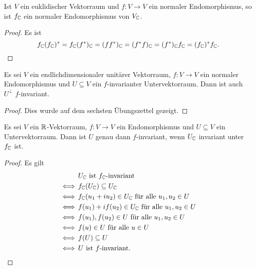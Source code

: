 \documentclass[a4paper,10pt]{article}
\begin{document}
\begin{corollary}\label{cor: complexification preserves normal}
  Ist $V$ ein euklidischer Vektorraum und $f \colon V \to V$ ein normaler Endomorphismus, so ist $f_{\mathbb{C}}$ ein normaler Endomorphismus von $V_{\mathbb{C}}$.
\end{corollary}


\begin{proof}
  Es ist
  \[
      f_{\mathbb{C}} (f_{\mathbb{C}})^*
    = f_{\mathbb{C}} (f^*)_{\mathbb{C}}
    = (f f^*)_{\mathbb{C}}
    = (f^* f)_{\mathbb{C}}
    = (f^*)_{\mathbb{C}} f_{\mathbb{C}}
    = (f_{\mathbb{C}})^* f_{\mathbb{C}}.
    \qedhere
  \]
\end{proof}


\begin{theorem}\label{thrm: invariance for unitary}
  Es sei $V$ ein endlichdimensionaler unitärer Vektorraum, $f \colon V \to V$ ein normaler Endomorphismus und $U \subseteq V$ ein $f$-invarianter Untervektorraum.
  Dann ist auch $U^\perp$ $f$-invariant.
\end{theorem}


\begin{proof}
  Dies wurde auf dem sechsten Übungszettel gezeigt.
\end{proof}


\begin{lemma}\label{lem: invariance of induced subspaces}
  Es sei $V$ ein $\mathbb{R}$-Vektorraum, $f \colon V \to V$ ein Endomorphismus und $U \subseteq V$ ein Untervektorraum.
  Dann ist $U$ genau dann $f$-invariant, wenn $U_{\mathbb{C}}$ invariant unter $f_{\mathbb{C}}$ ist.
\end{lemma}


\begin{proof}
  Es gilt
  \begin{align*}
        &\, \text{$U_{\mathbb{C}}$ ist $f_{\mathbb{C}}$-invariant}                            \\
    \iff&\, f_{\mathbb{C}}(U_{\mathbb{C}}) \subseteq U_{\mathbb{C}}                                   \\
    \iff&\, \text{$f_{\mathbb{C}}(u_1 + i u_2) \in U_{\mathbb{C}}$ für alle $u_1, u_2 \in U$} \\
    \iff&\, \text{$f(u_1) + i f(u_2) \in U_{\mathbb{C}}$ für alle $u_1, u_2 \in U$}   \\
    \iff&\, \text{$f(u_1), f(u_2) \in U$ für alle $u_1, u_2 \in U$}           \\
    \iff&\, \text{$f(u) \in U$ für alle $u \in U$}                            \\
    \iff&\, f(U) \subseteq U                                                  \\
    \iff&\, \text{$U$ ist $f$-invariant}.
    \qedhere
  \end{align*}
\end{proof}
\end{document}
